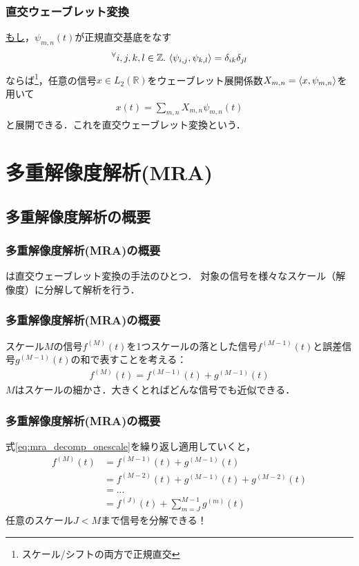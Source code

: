 \documentclass[dvipdfmx,graphicx,14pt]{beamer}
\begin{document}
\begin{frame}[c]
    \frametitle{直交ウェーブレット変換}
    \underline{もし}，$\psi_{m,n}(t)$が正規直交基底をなす
    \begin{align*}
        {}^{\forall} i,j,k,l \in \mathbb{Z}.\ \innprod{\psi_{i,j}}{\psi_{k,l}} = \delta_{ik} \delta_{jl}
    \end{align*}
    ならば\footnote{スケール/シフトの両方で正規直交}，任意の信号$x \in L_{2}(\mathbb{R})$をウェーブレット展開係数$X_{m,n} = \langle x, \psi_{m,n} \rangle$を用いて
    \begin{align}
        x(t) = \sum_{m,n} X_{m,n} \psi_{m,n}(t)
    \end{align}
    と展開できる．これを直交ウェーブレット変換という．
\end{frame}

\section{多重解像度解析(MRA)}

\subsection{多重解像度解析の概要}

\begin{frame}[c]
    \frametitle{多重解像度解析(MRA)の概要}
    は直交ウェーブレット変換の手法のひとつ．
    対象の信号を様々なスケール（解像度）に分解して解析を行う．
\end{frame}

\begin{frame}[c]
    \frametitle{多重解像度解析(MRA)の概要}
    スケール$M$の信号$f^{(M)}(t)$を1つスケールの落とした信号$f^{(M-1)}(t)$と誤差信号$g^{(M-1)}(t)$の和で表すことを考える：
    \begin{align}
        f^{(M)}(t) = f^{(M-1)}(t) + g^{(M-1)}(t) \label{eq:mra_decomp_onescale}
    \end{align}
    $M$はスケールの細かさ．大きくとればどんな信号でも近似できる．
\end{frame}

\begin{frame}[c]
    \frametitle{多重解像度解析(MRA)の概要}
    式\eqref{eq:mra_decomp_onescale}を繰り返し適用していくと，
    \begin{align}
        f^{(M)}(t) &= f^{(M-1)}(t) + g^{(M-1)}(t) \nonumber \\
        &= f^{(M-2)}(t) + g^{(M-1)}(t) + g^{(M-2)}(t) \nonumber \\
        &= ... \nonumber \\
        &= f^{(J)}(t) + \sum_{m=J}^{M-1} g^{(m)}(t) \label{eq:mra_decomp_multiscale}
    \end{align}
    任意のスケール$J < M$まで信号を分解できる！
\end{frame}
\end{document}
